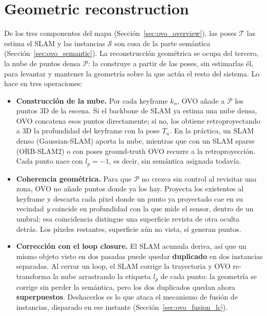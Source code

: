 \section{Geometric reconstruction}
\label{sec:ovo_geometric}

De los tres componentes del mapa (Sección~\ref{sec:ovo_overview}), las poses $\mathcal{T}$ las
estima el SLAM y las instancias $\mathcal{S}$ son cosa de la parte semántica
(Sección~\ref{sec:ovo_semantic}). La reconstrucción geométrica se ocupa del tercero, la nube de
puntos densa $\mathcal{P}$: la construye a partir de las poses, sin estimarlas él, para levantar y
mantener la geometría sobre la que actúa el resto del sistema. Lo hace en tres operaciones:

\begin{itemize}
  \item \textbf{Construcción de la nube.} Por cada keyframe $k_n$, OVO añade a $\mathcal{P}$ los
    puntos 3D de la escena. Si el backbone de SLAM ya estima una nube densa, OVO concatena esos
    puntos directamente; si no, los obtiene retroproyectando a 3D la profundidad del keyframe con
    la pose $T_n$. En la práctica, un SLAM denso (Gaussian-SLAM) aporta la nube, mientras que con
    un SLAM sparse (ORB-SLAM2) o con poses ground-truth OVO recurre a la retroproyección. Cada
    punto nace con $l_p = -1$, es decir, sin semántica asignada todavía.
  \item \textbf{Coherencia geométrica.} Para que $\mathcal{P}$ no crezca sin control al revisitar
    una zona, OVO no añade puntos donde ya los hay. Proyecta los existentes al keyframe y descarta
    cada píxel donde un punto ya proyectado cae en su vecindad \emph{y} coincide en profundidad con
    la que mide el sensor, dentro de un umbral; esa coincidencia distingue una superficie revista
    de otra oculta detrás. Los píxeles restantes, superficie aún no vista, sí generan puntos.
  \item \textbf{Corrección con el loop closure.} El SLAM acumula deriva, así que un mismo objeto
    visto en dos pasadas puede quedar \textbf{duplicado} en dos instancias separadas. Al cerrar un
    loop, el SLAM corrige la trayectoria y OVO re-transforma la nube arrastrando la etiqueta $l_p$
    de cada punto: la geometría se corrige sin perder la semántica, pero los dos duplicados quedan
    ahora \textbf{superpuestos}. Deshacerlos es lo que ataca el mecanismo de fusión de instancias,
    disparado en ese instante (Sección~\ref{sec:ovo_fusion_lc}).
\end{itemize}


